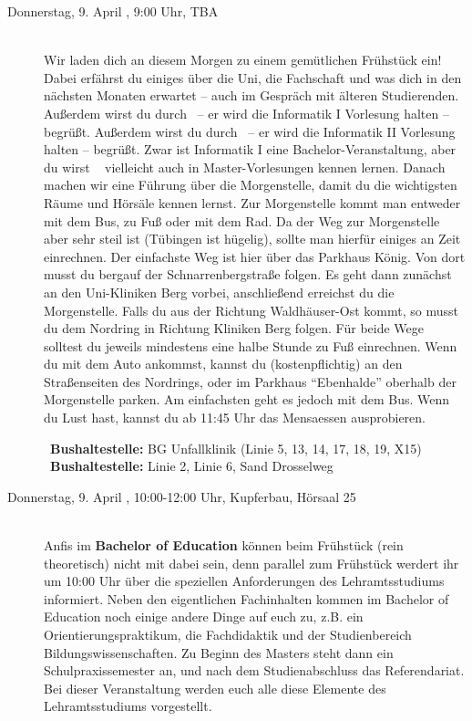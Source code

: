 \begin{description}
\else
    \item[Donnerstag, 9. April \YEAR, 9:00 Uhr, TBA]\ \\
        Wir laden dich an diesem Morgen zu einem gemütlichen Frühstück ein! Dabei erfährst du einiges über die Uni, die Fachschaft und was dich in den nächsten Monaten erwartet -- auch im Gespräch mit älteren Studierenden.
    \ifwintersemester Außerdem wirst du durch \Infoprof~-- er wird die Informatik I Vorlesung halten -- begrüßt. \fi
    \ifsommersemester Außerdem wirst du durch \Infoprof~-- er wird die Informatik II Vorlesung halten -- begrüßt. \fi
    \ifmaster Zwar ist Informatik I eine Bachelor-Veranstaltung, aber du wirst \Infoprof~ vielleicht auch in Master-Vorlesungen kennen lernen. \fi
    \ifwintersemester
        Danach machen wir eine Führung über die Morgenstelle, damit du die wichtigsten Räume und Hörsäle kennen lernst.
        Zur Morgenstelle kommt man entweder mit dem Bus, zu Fuß oder mit dem Rad. Da der Weg zur Morgenstelle aber sehr steil ist (Tübingen ist hügelig), sollte man hierfür einiges an Zeit einrechnen.
        Der einfachste Weg ist hier über das Parkhaus König. Von dort musst du bergauf der Schnarrenbergstraße folgen. Es geht dann zunächst an den Uni-Kliniken Berg vorbei, anschließend erreichst du die Morgenstelle. Falls du aus der Richtung Waldh\"auser-Ost kommt, so musst du dem Nordring in Richtung Kliniken Berg folgen. Für beide Wege solltest du jeweils mindestens eine halbe Stunde zu Fuß einrechnen.
        Wenn du mit dem Auto ankommst, kannst du (kostenpflichtig) an den Straßenseiten des Nordrings, oder im Parkhaus "`Ebenhalde"' oberhalb der Morgenstelle parken. Am einfachsten geht es jedoch mit dem Bus.
        Wenn du Lust hast, kannst du ab 11:45 Uhr das Mensaessen ausprobieren.
    \fi

    \ifwintersemester {}~\textbf{Bushaltestelle:} BG Unfallklinik (Linie 5, 13, 14, 17, 18, 19, X15) \fi
    \ifsommersemester {}~\textbf{Bushaltestelle:} Linie 2, Linie 6, Sand Drosselweg \fi
\fi

\iflehramt
    \item[Donnerstag, 9. April \YEAR, 10:00-12:00 Uhr, Kupferbau, Hörsaal 25]\ \\
        Anfis im \textbf{Bachelor of Education} können beim Frühstück (rein theoretisch) nicht mit dabei sein, denn parallel zum Frühstück werdert ihr um 10:00 Uhr über die speziellen Anforderungen des Lehramtsstudiums informiert. Neben den eigentlichen Fachinhalten kommen im Bachelor of Education noch einige andere Dinge auf euch zu, z.B. ein Orientierungspraktikum, die Fachdidaktik und der Studienbereich Bildungswissenschaften. Zu Beginn des Masters steht dann ein Schulpraxissemester an, und nach dem Studienabschluss das Referendariat. Bei dieser Veranstaltung werden euch alle diese Elemente des Lehramtsstudiums vorgestellt.


\end{description}
